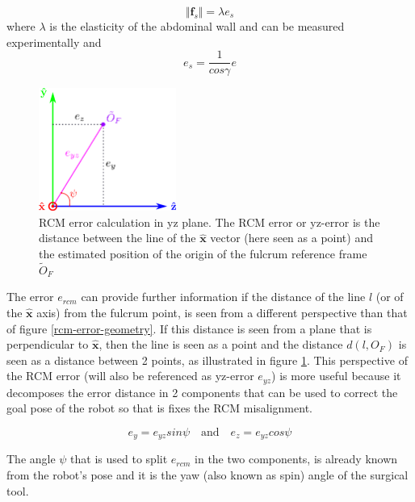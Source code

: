 \begin{equation}
\Vert \mathbf{f}_s \Vert = λ e_s
\end{equation}
where $λ$ is the elasticity of the abdominal wall and can be measured experimentally and
\begin{equation}
e_s = \frac{1}{cosγ} e
\end{equation}

\begin{center}
\begin{figure}[!htb]
\centering
\includegraphics[width=0.4\textwidth]{images/rcm-error-yz.png}
\caption{RCM error calculation in yz plane. The RCM error or yz-error is the distance between the line of the $\mathbf{\hat{x}}$ vector (here seen as a point) and the estimated position of the origin of the
fulcrum reference frame $\tilde{O}_F$}
\label{rcm-error-yz-plane}
\end{figure}
\end{center}

The error $e_{rcm}$ can provide further information if the distance of the line $l$ (or of the $\mathbf{\hat{x}}$ axis) from the fulcrum point, is seen from a different perspective than that of 
figure \ref{rcm-error-geometry}. If this distance is seen from a plane that is perpendicular to $\mathbf{\hat{x}}$, then the line is seen as a point and the distance $d(l, O_F)$ is seen as a distance between 2 points, 
as illustrated in figure \ref{rcm-error-yz-plane}. This perspective of the RCM error (will also be referenced as yz-error $e_{yz}$) is more useful because it decomposes the error distance in 2 components that can be used to 
correct the goal pose of the robot so that is fixes the RCM misalignment.

\begin{equation}
e_y = e_{yz}sinψ \quad \textrm{and} \quad e_z = e_{yz}cosψ
\end{equation}

The angle $ψ$ that is used to split $e_{rcm}$ in the two components, is already known from the robot's pose and it is the yaw (also known as spin) angle of the surgical tool.\\


